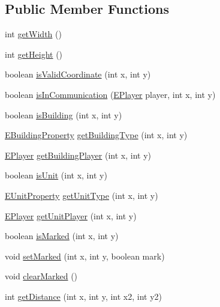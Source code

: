 \subsection*{Public Member Functions}
\begin{DoxyCompactItemize}
\item 
int \mbox{\hyperlink{interfacegame_1_1board_1_1_i_board_a86c145dd3518d14b37f6b50ee67bc629}{get\+Width}} ()
\item 
int \mbox{\hyperlink{interfacegame_1_1board_1_1_i_board_ac72f72b8a25b8cd594e4c8c1a6ce6ca8}{get\+Height}} ()
\item 
boolean \mbox{\hyperlink{interfacegame_1_1board_1_1_i_board_ad6794d47ba9f6c10be5fd956c786f0b5}{is\+Valid\+Coordinate}} (int x, int y)
\item 
boolean \mbox{\hyperlink{interfacegame_1_1board_1_1_i_board_a56c04deed490c7894f738f6d76f62f07}{is\+In\+Communication}} (\mbox{\hyperlink{enumgame_1_1_e_player}{E\+Player}} player, int x, int y)
\item 
boolean \mbox{\hyperlink{interfacegame_1_1board_1_1_i_board_aa493421a953d10fc9eaf45fa74f0a64d}{is\+Building}} (int x, int y)
\item 
\mbox{\hyperlink{enumrule_engine_1_1entity_1_1_e_building_property}{E\+Building\+Property}} \mbox{\hyperlink{interfacegame_1_1board_1_1_i_board_aeba201e4626a88c31e6f86894b1eab49}{get\+Building\+Type}} (int x, int y)
\item 
\mbox{\hyperlink{enumgame_1_1_e_player}{E\+Player}} \mbox{\hyperlink{interfacegame_1_1board_1_1_i_board_a3be0f107436cd176949e9a94a90f7134}{get\+Building\+Player}} (int x, int y)
\item 
boolean \mbox{\hyperlink{interfacegame_1_1board_1_1_i_board_aeb50b7b22128aaddcbea6330ba78a03e}{is\+Unit}} (int x, int y)
\item 
\mbox{\hyperlink{enumrule_engine_1_1entity_1_1_e_unit_property}{E\+Unit\+Property}} \mbox{\hyperlink{interfacegame_1_1board_1_1_i_board_a3454c1934e15ea532165597697e1f73d}{get\+Unit\+Type}} (int x, int y)
\item 
\mbox{\hyperlink{enumgame_1_1_e_player}{E\+Player}} \mbox{\hyperlink{interfacegame_1_1board_1_1_i_board_a5f4d593eb6fcd82b36ddd8f629ceee03}{get\+Unit\+Player}} (int x, int y)
\item 
boolean \mbox{\hyperlink{interfacegame_1_1board_1_1_i_board_ae5dd67cb593fd6609401b115faa4c42e}{is\+Marked}} (int x, int y)
\item 
void \mbox{\hyperlink{interfacegame_1_1board_1_1_i_board_a334f717410bd56a0112a70ce2a832c93}{set\+Marked}} (int x, int y, boolean mark)
\item 
void \mbox{\hyperlink{interfacegame_1_1board_1_1_i_board_a070b6270c21257546f66b2df878fecc7}{clear\+Marked}} ()
\item 
int \mbox{\hyperlink{interfacegame_1_1board_1_1_i_board_ae6a102ff58e3ee5d8cd4c4255790feff}{get\+Distance}} (int x, int y, int x2, int y2)
\end{DoxyCompactItemize}


